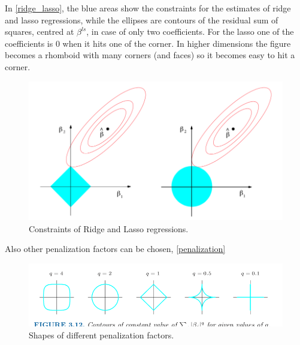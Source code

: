 \documentclass[12pt, letterpaper]{article}
\theoremstyle{definition}
\begin{document}
In \autoref{ridge_lasso}, the blue areas show the constraints for the estimates of ridge and lasso regressions, while the ellipses are contours of the residual sum of squares, centred at $\beta^{ls}$, in case of only two coefficients. For the lasso one of the coefficients is $0$ when it hits one of the corner. In higher dimensions the figure becomes a rhomboid with many corners (and faces) so it becomes easy to hit a corner. 
\begin{figure}
\centering
\includegraphics[scale=0.4]{img/ridge_lasso}
\caption{Constraints of Ridge and Lasso regressions.}
\label{ridge_lasso}
\end{figure}

Also other penalization factors can be chosen, \autoref{penalization}

\begin{figure}
\centering
\includegraphics[scale=0.4]{img/penalization}
\caption{Shapes of different penalization factors.}
\label{penalization}
\end{figure}
\end{document}
